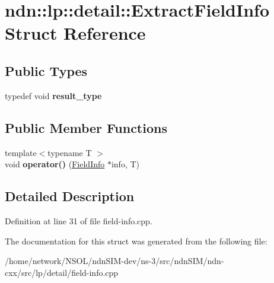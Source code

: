 \hypertarget{structndn_1_1lp_1_1detail_1_1ExtractFieldInfo}{}\section{ndn\+:\+:lp\+:\+:detail\+:\+:Extract\+Field\+Info Struct Reference}
\label{structndn_1_1lp_1_1detail_1_1ExtractFieldInfo}
\subsection*{Public Types}
\begin{DoxyCompactItemize}
\item 
typedef void {\bfseries result\+\_\+type}\hypertarget{structndn_1_1lp_1_1detail_1_1ExtractFieldInfo_ae2d35ae919eb4343d40e4954c8a26749}{}\label{structndn_1_1lp_1_1detail_1_1ExtractFieldInfo_ae2d35ae919eb4343d40e4954c8a26749}

\end{DoxyCompactItemize}
\subsection*{Public Member Functions}
\begin{DoxyCompactItemize}
\item 
{\footnotesize template$<$typename T $>$ }\\void {\bfseries operator()} (\hyperlink{classndn_1_1lp_1_1detail_1_1FieldInfo}{Field\+Info} $\ast$info, T)\hypertarget{structndn_1_1lp_1_1detail_1_1ExtractFieldInfo_abf6b8bc97383cd0af18eaf5ad6bc5d83}{}\label{structndn_1_1lp_1_1detail_1_1ExtractFieldInfo_abf6b8bc97383cd0af18eaf5ad6bc5d83}

\end{DoxyCompactItemize}


\subsection{Detailed Description}


Definition at line 31 of file field-\/info.\+cpp.



The documentation for this struct was generated from the following file\+:\begin{DoxyCompactItemize}
\item 
/home/network/\+N\+S\+O\+L/ndn\+S\+I\+M-\/dev/ns-\/3/src/ndn\+S\+I\+M/ndn-\/cxx/src/lp/detail/field-\/info.\+cpp\end{DoxyCompactItemize}
